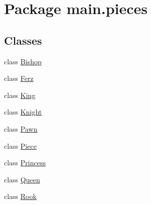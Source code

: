 \hypertarget{namespacemain_1_1pieces}{}\section{Package main.\+pieces}
\label{namespacemain_1_1pieces}
\subsection*{Classes}
\begin{DoxyCompactItemize}
\item 
class \hyperlink{classmain_1_1pieces_1_1_bishop}{Bishop}
\item 
class \hyperlink{classmain_1_1pieces_1_1_ferz}{Ferz}
\item 
class \hyperlink{classmain_1_1pieces_1_1_king}{King}
\item 
class \hyperlink{classmain_1_1pieces_1_1_knight}{Knight}
\item 
class \hyperlink{classmain_1_1pieces_1_1_pawn}{Pawn}
\item 
class \hyperlink{classmain_1_1pieces_1_1_piece}{Piece}
\item 
class \hyperlink{classmain_1_1pieces_1_1_princess}{Princess}
\item 
class \hyperlink{classmain_1_1pieces_1_1_queen}{Queen}
\item 
class \hyperlink{classmain_1_1pieces_1_1_rook}{Rook}
\end{DoxyCompactItemize}
